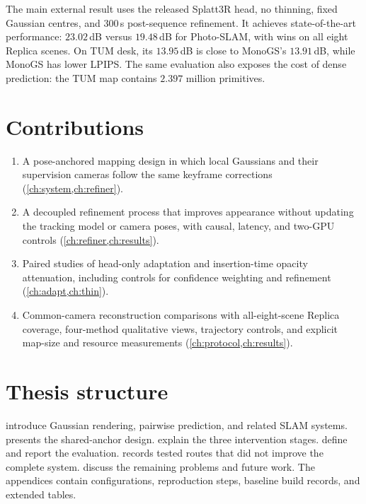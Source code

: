 The main external result uses the released Splatt3R head, no thinning,
fixed Gaussian centres, and $300$\,s post-sequence refinement. It achieves
state-of-the-art performance: $23.02$\,dB versus $19.48$\,dB for Photo-SLAM,
with wins on all eight Replica scenes.
On TUM desk, its $13.95$\,dB is close to MonoGS's $13.91$\,dB, while
MonoGS has lower LPIPS. The same evaluation also exposes the cost of dense
prediction: the TUM map contains $2.397$ million primitives.

\section{Contributions}
\label{sec:intro:contrib}

\begin{enumerate}\itemsep4pt
\item A pose-anchored mapping design in which local Gaussians and their
supervision cameras follow the same keyframe corrections
(\cref{ch:system,ch:refiner}).
\item A decoupled refinement process that improves appearance without
updating the tracking model or camera poses, with causal, latency, and
two-GPU controls (\cref{ch:refiner,ch:results}).
\item Paired studies of head-only adaptation and insertion-time opacity
attenuation, including controls for confidence weighting and refinement
(\cref{ch:adapt,ch:thin}).
\item Common-camera reconstruction comparisons with all-eight-scene Replica
coverage, four-method qualitative views, trajectory controls, and explicit
map-size and resource measurements (\cref{ch:protocol,ch:results}).
\end{enumerate}

\section{Thesis structure}

 introduce Gaussian rendering, pairwise prediction,
and related SLAM systems.  presents the shared-anchor design.
 explain the three intervention stages.
 define and report the evaluation.
 records tested routes that did not improve the complete
system.  discuss the remaining problems
and future work. The appendices contain configurations, reproduction steps,
baseline build records, and extended tables.

